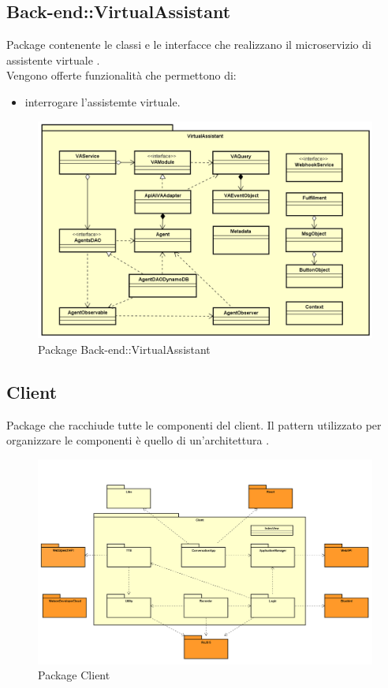 \subsection{Back-end::VirtualAssistant}
Package contenente le classi e le interfacce che realizzano il microservizio di assistente virtuale .\\ Vengono offerte funzionalità che permettono di: \begin{itemize} \item interrogare l'assistemte virtuale. \end{itemize}
\begin{figure}[h] \centering \includegraphics[width=\textwidth,height=\textheight,keepaspectratio]{images/diagrams/back-end/Official_Backend_0304/VirtualAssistant.png}
\caption{Package Back-end::VirtualAssistant}
\end{figure}
\newpage

\subsection{Client}
Package che racchiude tutte le componenti del client. Il pattern utilizzato per organizzare le componenti è quello di un'architettura .
\begin{figure}[h] \centering \includegraphics[width=\textwidth,height=\textheight,keepaspectratio]{images/diagrams/client/Client/Client.png}
\caption{Package Client}
\end{figure}
\newpage



